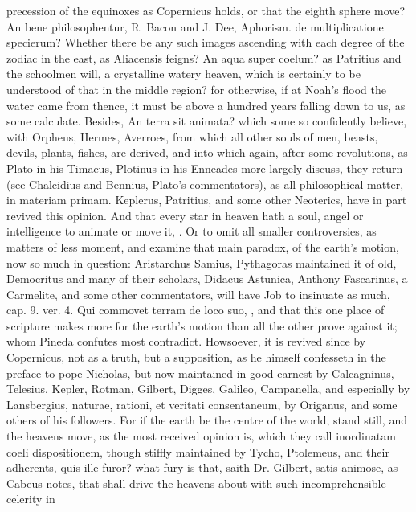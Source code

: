 {precession of the equinoxes as Copernicus holds, or that the eighth
sphere move? An bene philosophentur, R. Bacon and J. Dee, Aphorism. de
multiplicatione specierum? Whether there be any such images ascending
with each degree of the zodiac in the east, as Aliacensis feigns? An
aqua super coelum? as Patritius and the schoolmen will, a crystalline
watery heaven, which is  certainly to be understood of that
in the middle region? for otherwise, if at Noah's flood the water came
from thence, it must be above a hundred years falling down to us, as
some calculate. Besides, An terra sit animata? which some so
confidently believe, with Orpheus, Hermes, Averroes, from which all
other souls of men, beasts, devils, plants, fishes, \etc{} are derived,
and into which again, after some revolutions, as Plato in his Timaeus,
Plotinus in his Enneades more largely discuss, they return (see
Chalcidius and Bennius, Plato's commentators), as all philosophical
matter, in materiam primam. Keplerus, Patritius, and some other
Neoterics, have in part revived this opinion. And that every star in
heaven hath a soul, angel or intelligence to animate or move it, \etc{}. Or
to omit all smaller controversies, as matters of less moment, and
examine that main paradox, of the earth's motion, now so much in
question: Aristarchus Samius, Pythagoras maintained it of old,
Democritus and many of their scholars, Didacus Astunica, Anthony
Fascarinus, a Carmelite, and some other commentators, will have Job to
insinuate as much, cap. 9. ver. 4. Qui commovet terram de loco suo,
\etc{}, and that this one place of scripture makes more for the earth's
motion than all the other prove against it; whom Pineda confutes most
contradict. Howsoever, it is revived since by Copernicus, not as a
truth, but a supposition, as he himself confesseth in the preface to
pope Nicholas, but now maintained in good earnest by 
Calcagninus, Telesius, Kepler, Rotman, Gilbert, Digges, Galileo,
Campanella, and especially by Lansbergius, naturae, rationi, et
veritati consentaneum, by Origanus, and some others of his
followers. For if the earth be the centre of the world, stand still,
and the heavens move, as the most received opinion is, which they
call inordinatam coeli dispositionem, though stiffly maintained by
Tycho, Ptolemeus, and their adherents, quis ille furor? \etc{} what fury
is that, saith Dr. Gilbert, satis animose, as Cabeus notes, that
shall drive the heavens about with such incomprehensible celerity in
}
